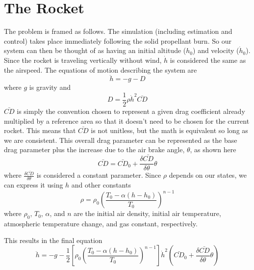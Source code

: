 \documentclass{article}
\begin{document}
\section{The Rocket}
  The problem is framed as follows. The simulation (including estimation and control) takes place immediately following the solid propellant burn. So our system can then be thought of as having an initial altitude ($h_0$) and velocity ($\dot{h}_0$). Since the rocket is traveling vertically without wind, $\dot{h}$ is considered the same as the airspeed. The equations of motion describing the system are
  \begin{equation}
    \ddot{h} = -g -D
  \end{equation}
  where $g$ is gravity and
  \begin{equation}
    D = \frac{1}{2} \rho \dot{h}^2 \bar{CD}
  \end{equation}
  $\bar{CD}$ is simply the convention chosen to represent a given drag coefficient already multiplied by a reference area so that it doesn't need to be chosen for the current rocket. This means that $\bar{CD}$ is not unitless, but the math is equivalent so long as we are consistent. This overall drag parameter can be represented as the base drag parameter plus the increase due to the air brake angle, $\theta$, as shown here
  \begin{equation}
    \bar{CD} = \bar{CD}_0 + \frac{\delta\bar{CD}}{\delta\theta} \theta
  \end{equation}
  where $\frac{\delta\bar{CD}}{\delta\theta}$ is considered a constant parameter. Since $\rho$ depends on our states, we can express it using $h$ and other constants
  \begin{equation}
    \rho = \rho_0 \left(   \frac{T_0 - \alpha\left( h-h_0 \right)}{T_0}   \right)^{n-1}
  \end{equation}
  where $\rho_0$, $T_0$, $\alpha$, and $n$ are the initial air density, initial air temperature, atmospheric temperature change, and gas constant, respectively.

  This results in the final equation
  \begin{equation}
    \ddot{h} = -g -\frac{1}{2} \left[\rho_0 \left(   \frac{T_0 - \alpha\left( h-h_0 \right)}{T_0}   \right)^{n-1}\right] \dot{h}^2 \left(\bar{CD}_0 + \frac{\delta\bar{CD}}{\delta\theta} \theta \right)
  \end{equation}
\end{document}
